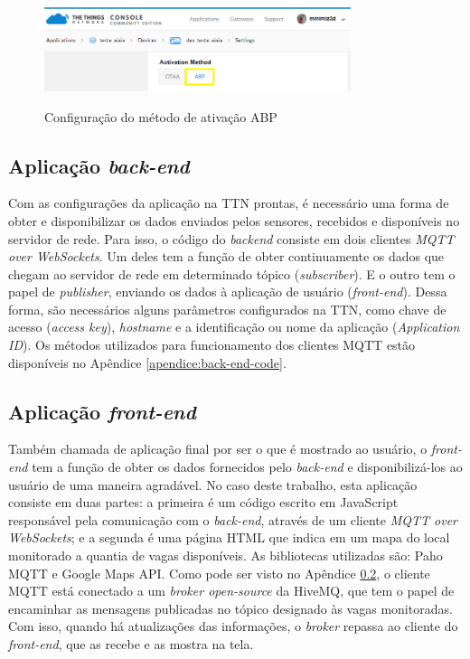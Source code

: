 \documentclass[oneside,openright,12pt]{ufsm_2015} %
\begin{document}
    \begin{figure}[ht]
 	    \caption{\label{exepretex} Configuração do método de ativação ABP}
        \centering
        \includegraphics[width=0.8\textwidth]{figuras/device_settings.png}
        \vspace{\baselineskip} %
        \label{fig:dev-settings-ttn}
    \end{figure}
    
    \subsection{Aplicação \textit{back-end}}
    Com as configurações da aplicação na TTN prontas, é necessário uma forma de obter e disponibilizar os dados enviados pelos sensores, recebidos e disponíveis no servidor de rede. Para isso, o código do \textit{backend} consiste em dois clientes \textit{MQTT over WebSockets}. Um deles tem a função de obter continuamente os dados que chegam ao servidor de rede em determinado tópico (\textit{subscriber}). E o outro tem o papel de \textit{publisher}, enviando os dados à aplicação de usuário (\textit{front-end}). Dessa forma, são necessários alguns parâmetros configurados na TTN, como chave de acesso (\textit{access key}), \textit{hostname} e a identificação ou nome da aplicação (\textit{Application ID}). Os métodos utilizados para funcionamento dos clientes MQTT estão disponíveis no Apêndice \ref{apendice:back-end-code}.
    
    \subsection{Aplicação \textit{front-end}}
    Também chamada de aplicação final por ser o que é mostrado ao usuário, o \textit{front-end} tem a função de obter os dados fornecidos pelo \textit{back-end} e disponibilizá-los ao usuário de uma maneira agradável. No caso deste trabalho, esta aplicação consiste em duas partes: a primeira é um código escrito em JavaScript responsável pela comunicação com o \textit{back-end}, através de um cliente \textit{MQTT over WebSockets}; e a segunda é uma página HTML que indica em um mapa do local monitorado a quantia de vagas disponíveis. As bibliotecas utilizadas são: Paho MQTT e Google Maps API. Como pode ser visto no Apêndice \ref{}, o cliente MQTT está conectado a um \textit{broker open-source} da HiveMQ, que tem o papel de encaminhar as mensagens publicadas no tópico designado às vagas monitoradas. Com isso, quando há atualizações das informações, o \textit{broker} repassa ao cliente do \textit{front-end}, que as recebe e as mostra na tela.
    
\end{document}

